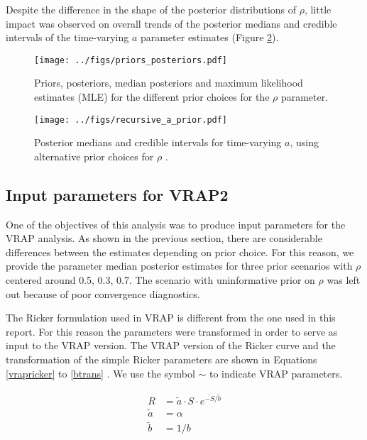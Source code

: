 \documentclass{article}
\begin{document}
Despite the difference in the shape of the posterior distributions of $\rho$, little impact was observed on overall trends of the posterior medians and credible intervals of the time-varying $a$ parameter estimates (Figure \ref{a_estimates_prior}). 




\begin{figure}[htbp]
  \centering
  \texttt{[image: ../figs/priors\_posteriors.pdf]}
  \caption{Priors, posteriors, median posteriors and maximum likelihood estimates (MLE) for the different prior choices for the $\rho$ parameter.}
\label{rho_estimates}
\end{figure}


\begin{figure}[htbp]
  \centering
  \texttt{[image: ../figs/recursive\_a\_prior.pdf]}
  \caption{Posterior medians and credible intervals for time-varying $a$, using alternative prior choices for $\rho$ .}
\label{a_estimates_prior}
\end{figure}





\subsection{Input parameters for VRAP2}

One of the objectives of this analysis was to produce input parameters for the VRAP analysis. As shown in the previous section, there are considerable differences between the estimates depending on prior choice. For this reason, we provide the parameter median posterior estimates for three prior scenarios with $\rho$ centered around 0.5, 0.3, 0.7. The scenario with uninformative prior on $\rho$ was left out because of poor convergence diagnostics. 

The Ricker formulation used in VRAP is different from the one used in this report. For this reason the parameters were transformed in order to serve as input to the VRAP version. The VRAP version of the Ricker curve and the transformation of the simple Ricker parameters are shown in Equations \ref{vrapricker} to \ref{btrans} . We use the symbol $\sim$ to indicate VRAP parameters. 



\begin{align} 
\label{vrapricker}
R &= \widetilde{a} \cdot S \cdot e^{-S/\widetilde{b}}\\
\label{atrans}
\widetilde{a} &= \alpha \\
\label{btrans}
\widetilde{b} &= 1/b
\end{align}
\end{document}
